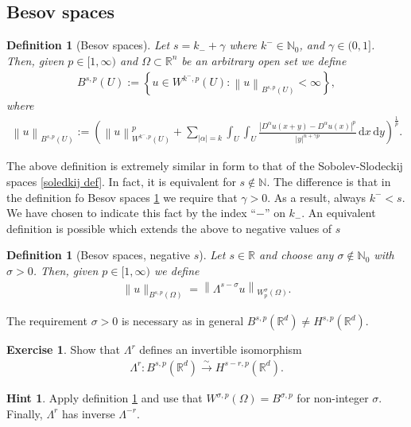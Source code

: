 \documentclass[
    a4paper,
    DIV=14,
    abstract=true,
    numbers=noenddot
]
{scrartcl}
\newtheorem{definition}[theorem]{Definition}
\theoremstyle{definition}
\newtheorem{exercise}{Exercise}
\newtheorem*{hint}{Hint}
\newcommand{\set}[1]{\left\{#1\right\}}
\renewcommand{\norm}[1]{\left\lVert #1 \right\rVert}\renewcommand{\abs}[1]{\left| #1 \right|}
\newcommand{\iso}{\xrightarrow{\sim}}
\renewcommand{\d}{\,\mathrm{d}}\newcommand{\dx}{\,\mathrm{d}x}
\newcommand{\N}{\mathbb{N}}
\newcommand{\R}{\mathbb{R}}
\begin{document}
\subsection{Besov spaces}
\begin{definition}[Besov spaces]\label{besov def}
    Let $s=k_{-}+\gamma$ where $k^{-} \in \N_0$, and $\gamma \in (0,1]$. Then, given  $p \in [1,\infty)$ and $\Omega  \subset \R^n$ be an arbitrary open set we define
    \begin{align*}
        B^{s ,p}(U):= \set{u \in W^{k^{-} ,p}(U): \norm{u}_{B^{s,p}(U)}<\infty},
    \end{align*}
    where
    \begin{align*}
        \norm{u}_{B^{s,p}(U)}:= \left(\norm{u}_{W^{k^{-},p}(U)}^p+ \sum_{\abs{\alpha}=k }\int_{U}\int_{U}\frac{\abs{D^\alpha u(x+y)-D^\alpha u(x)}^p}{\abs{y}^{n+\gamma p}}\d x \d y\right)^\frac{1}{p}.
    \end{align*}
\end{definition}
The above definition is extremely similar in form to that of the Sobolev-Slodeckij spaces \ref{soledkij def}. In fact, it is equivalent for $s \notin \N$.  The difference is that in the definition fo Besov spaces \ref{besov def} we require that $\gamma >0$. As a result, always $k^{-}<s$. We have chosen to indicate this fact by the index ``$-$'' on $k_{-}$. An equivalent definition is possible which extends the above to negative values of $s$
\begin{definition}[Besov spaces, negative $s$]\label{besov def negative}
    Let $s \in \R$ and choose any $\sigma \not\in \N_0$ with $\sigma >0$. Then, given  $p \in [1,\infty)$ we define
    \begin{align*}
        \|u\|_{B^{s,p}(\Omega)}=\left\|\Lambda^{s-\sigma} u\right\|_{W_p^\sigma(\Omega)}.
    \end{align*}
\end{definition}
The requirement $\sigma >0$ is necessary as in general $B^{s,p}(\R^d)\neq H^{s,p}(\R^d)$.
\begin{exercise}
    Show that $\Lambda ^r$ defines an invertible isomorphism
    \begin{align*}
        \Lambda ^r: B^{s,p}(\R^d)\iso H^{s-r,p}(\R^d).
    \end{align*}
\end{exercise}
\begin{hint}
    Apply definition \ref{besov def negative} and use that $W^{\sigma,p}(\Omega )= B^{\sigma,p } $ for non-integer $\sigma$. Finally,   $\Lambda^r$ has inverse $\Lambda^{-r}$.
\end{hint}
\end{document}
